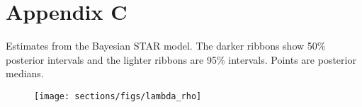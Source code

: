 \clearpage
\chapter[Parameter estimates]{Appendix C}\label{AppendixC}

Estimates from the Bayesian STAR model. The darker ribbons show 50\% posterior intervals and the lighter ribbons are 95\% intervals. Points are posterior medians. 

\begin{figure}[h]
\centering
	\texttt{[image: sections/figs/lambda\_rho]}
\label{fig:lambda_rho}
\end{figure}

